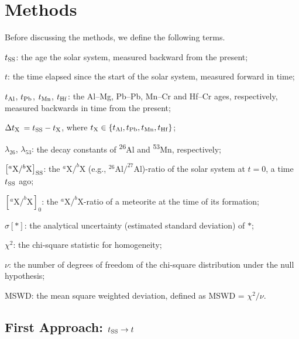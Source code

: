 \section{Methods} %
Before discussing the methods, we define the following terms.
\begin{description}
\item{$\mbox{$t_{\rm SS}$}$:} the age the solar system, measured backward from the
  present;
\item{$t$:} the time elapsed since the start of the solar system,
  measured forward in time;
\item{$\mbox{$t_{\rm Al}$}$, $\mbox{$t_{\rm Pb}$}$, $\mbox{$t_{\rm Mn}$}$, $\mbox{$t_{\rm Hf}$}$:} the Al--Mg, Pb--Pb, Mn--Cr and
  Hf--Cr ages, respectively, measured backwards in time from the
  present;
\item{$\Delta t_{\rm X}$} $= \mbox{$t_{\rm SS}$} - t_{\rm X}$, where $t_{\rm X} \in
  \{\mbox{$t_{\rm Al}$}, \mbox{$t_{\rm Pb}$}, \mbox{$t_{\rm Mn}$}, \mbox{$t_{\rm Hf}$}\}$;
\item{$\lambda_{26}$, $\lambda_{53}$:} the decay constants of
  \textsuperscript{26}Al and \textsuperscript{53}Mn, respectively;
\item{$\left[{}^{a}\mbox{X}/^{b}\mbox{X}\right]_{\rm SS}$:} the
  ${}^{a}\mbox{X}/^{b}\mbox{X}$ (e.g.,
  ${}^{26}\mbox{Al}/^{27}\mbox{Al}$)-ratio of the solar system at
  $t=0$, a time $\mbox{$t_{\rm SS}$}$ ago;
\item{$\left[{}^{a}\mbox{X}/^{b}\mbox{X}\right]_{0}$:} the
  ${}^{a}\mbox{X}/^{b}\mbox{X}$-ratio of a meteorite at the time of
  its formation;
\item{$\sigma[\ast]$:} the analytical uncertainty (estimated standard
  deviation) of $\ast$;
\item{$\chi^2$:} the chi-square statistic for homogeneity;
\item{$\nu$:} the number of degrees of freedom of the chi-square
  distribution under the null hypothesis;
\item{MSWD:} the mean square weighted deviation, defined as MSWD =
  $\chi^2/\nu$.
\end{description}

\subsection{First Approach: $\mbox{$t_{\rm SS}$} \rightarrow t$}
\label{sec:means}

